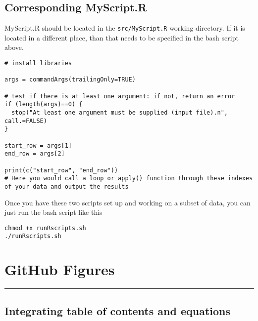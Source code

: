 \documentclass[
  letterpaper,
  DIV=11,
  numbers=noendperiod]{scrreprt}
\begin{document}
\hypertarget{corresponding-myscript.r}{%
\section*{\texorpdfstring{\textbf{Corresponding
MyScript.R}}{Corresponding MyScript.R}}\label{corresponding-myscript.r}}


MyScript.R should be located in the \texttt{src/MyScript.R} working
directory. If it is located in a different place, than that needs to be
specified in the bash script above.

\begin{verbatim}
# install libraries

args = commandArgs(trailingOnly=TRUE)

# test if there is at least one argument: if not, return an error
if (length(args)==0) {
  stop("At least one argument must be supplied (input file).n", call.=FALSE)
} 

start_row = args[1]
end_row = args[2]

print(c("start_row", "end_row"))
# Here you would call a loop or apply() function through these indexes of your data and output the results
\end{verbatim}

Once you have these two scripts set up and working on a subset of data,
you can just run the bash script like this

\begin{verbatim}
chmod +x runRscripts.sh
./runRscripts.sh
\end{verbatim}

\hypertarget{github-figures}{%
\chapter{GitHub Figures}\label{github-figures}}

\begin{center}\rule{0.5\linewidth}{0.5pt}\end{center}

\hypertarget{integrating-table-of-contents-and-equations}{%
\section{Integrating table of contents and
equations}\label{integrating-table-of-contents-and-equations}}
\end{document}
